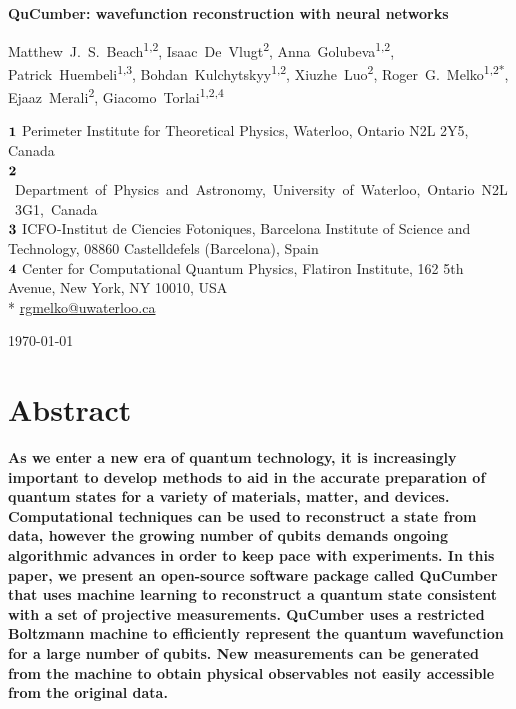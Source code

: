 \documentclass[submission, Phys, hidelnks]{SciPost}
\begin{document}
\begin{center}{\Large \textbf{
    QuCumber: wavefunction reconstruction with neural networks
}}\end{center}

\begin{center}
    Matthew~J.~S.~Beach\textsuperscript{1,2},
    Isaac~De~Vlugt\textsuperscript{2},
    Anna~Golubeva\textsuperscript{1,2},
    Patrick~Huembeli\textsuperscript{1,3},
    Bohdan~Kulchytskyy\textsuperscript{1,2},
    Xiuzhe~Luo\textsuperscript{2},
    Roger~G.~Melko\textsuperscript{1,2*},
    Ejaaz~Merali\textsuperscript{2},
    Giacomo~Torlai\textsuperscript{1,2,4}
\end{center}

\begin{center}
    ${\bf 1}$ Perimeter Institute for Theoretical Physics, Waterloo,
    Ontario N2L 2Y5, Canada
    \\
    \mbox{${\bf 2}$ Department of Physics and Astronomy, University of Waterloo,
    Ontario N2L 3G1, Canada}
    \\
    ${\bf 3}$ ICFO-Institut de Ciencies Fotoniques, Barcelona Institute of Science and Technology,
    08860 Castelldefels (Barcelona), Spain
    \\
    ${\bf 4}$ Center for Computational Quantum Physics, Flatiron Institute,
    162 5th Avenue, New York, NY 10010, USA\\

    * \href{mailto:rgmelko@uwaterloo.ca}{rgmelko@uwaterloo.ca}
\end{center}
\begin{center}
\today
\end{center}
\section*{Abstract}
{\bf
As we enter a new era of quantum technology, it is increasingly important to
develop methods to aid in the accurate preparation of quantum states
for a variety of materials, matter, and devices.
Computational techniques can be used to reconstruct a state from data,
however the growing number of qubits demands ongoing algorithmic advances
in order to keep pace with experiments.
In this paper, we present an open-source software package called QuCumber that
uses machine learning to reconstruct a quantum state consistent
with a set of projective measurements. QuCumber uses a restricted
Boltzmann machine to efficiently represent the quantum wavefunction for a large
number of qubits.
New measurements can be generated from the machine to
obtain physical observables not easily accessible from the original data.
}
\end{document}
